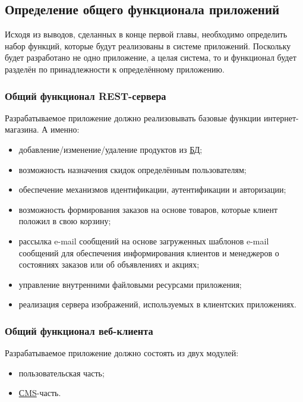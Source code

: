 \subsection{Определение общего функционала приложений}\label{subsec:2-define-functionality}\indent

Исходя из выводов, сделанных в конце первой главы, необходимо определить набор функций, которые будут реализованы в системе приложений.
Поскольку будет разработано не одно приложение, а целая система, то и функционал будет разделён по принадлежности к определённому приложению.

\subsubsection{Общий функционал REST-сервера}\indent

Разрабатываемое приложение должно реализовывать базовые функции интернет-магазина.
А именно:

\begin{itemize}
    \item добавление/изменение/удаление продуктов из \hyperlink{gloss:db}{БД};
    \item возможность назначения скидок определённым пользователям;
    \item обеспечение механизмов идентификации, аутентификации и авторизации;
    \item возможность формирования заказов на основе товаров, которые клиент положил в свою корзину;
    \item рассылка e-mail сообщений на основе загруженных шаблонов e-mail сообщений для обеспечения информирования клиентов и менеджеров о состояниях заказов или об объявлениях и акциях;
    \item управление внутренними файловыми ресурсами приложения;
    \item реализация сервера изображений, используемых в клиентских приложениях.
\end{itemize}

\subsubsection{Общий функционал веб-клиента}\indent

Разрабатываемое приложение должно состоять из двух модулей:

\begin{itemize}
    \item пользовательская часть;
    \item \hyperlink{gloss:cms}{СMS}-часть.
\end{itemize}

